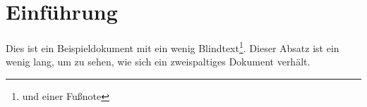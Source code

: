 \documentclass{memoir} %
\begin{document}
\chapter{Einführung}

Dies ist ein Beispieldokument mit ein wenig
Blindtext\footnote{und einer Fußnote}. Dieser Absatz ist ein
wenig lang, um zu sehen, wie sich ein zweispaltiges Dokument
verhält.
\end{document}
